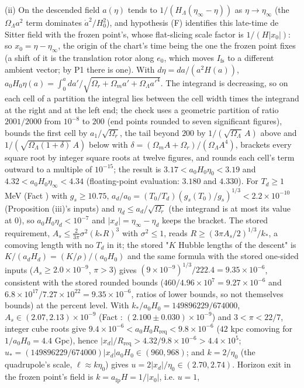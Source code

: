 (ii) On the descended field $a(\eta)$ tends to $1/(H_{\Lambda}(\eta_{\infty} - \eta))$ as $\eta \to \eta_{\infty}$ (the $\Omega_{\Lambda}a^{2}$ term dominates $\dot a^{2}/H_{0}^{2}$), and hypothesis (F) identifies this late-time de Sitter field with the frozen point's, whose flat-slicing scale factor is $1/(H|x_{0}|)$: so $x_{0} = \eta - \eta_{\infty}$, the origin of the chart's time being the one the frozen point fixes (a shift of it is the translation rotor along $e_{0}$, which moves $I_{\mathrm{fs}}$ to a different ambient vector; by P1 there is one). With $d\eta = da/(a^{2}H(a))$, $a_{0}H_{0}\eta(a) = \int_{0}^{a}da'/\sqrt{\Omega_{r} + \Omega_{m}a' + \Omega_{\Lambda}a'^{4}}$. The integrand is decreasing, so on each cell of a partition the integral lies between the cell width times the integrand at the right and at the left end; the check uses a geometric partition of ratio $2001/2000$ from $10^{-8}$ to $200$ (end points rounded to seven significant figures), bounds the first cell by $a_{1}/\sqrt{\Omega_{r}}$, the tail beyond $200$ by $1/(\sqrt{\Omega_{\Lambda}}\,A)$ above and $1/(\sqrt{\Omega_{\Lambda}(1 + \delta)}\,A)$ below with $\delta = (\Omega_{m}A + \Omega_{r})/(\Omega_{\Lambda}A^{4})$, brackets every square root by integer square roots at twelve figures, and rounds each cell's term outward to a multiple of $10^{-15}$; the result is $3.17 < a_{0}H_{0}\eta_{0} < 3.19$ and $4.32 < a_{0}H_{0}\eta_{\infty} < 4.34$ (floating-point evaluation: $3.180$ and $4.330$). For $T_{d} \ge 1$ MeV (Fact ) with $g_{s} \ge 10.75$, $a_{d}/a_{0} = (T_{0}/T_{d})(g_{s}(T_{0})/g_{s})^{1/3} < 2.2 \times 10^{-10}$ (Proposition (iii)'s inputs) and $\eta_{d} \le a_{d}/\sqrt{\Omega_{r}}$ (the integrand is at most its value at $0$), so $a_{0}H_{0}\eta_{d} < 10^{-7}$ and $|x_{d}| = \eta_{\infty} - \eta_{d}$ keeps the bracket. The stored requirement, $A_{s} \le \tfrac{2}{3\pi}\sigma^{2}(k_{*}R)^{3}$ with $\sigma^{2} \le 1$, reads $R \ge (3\pi A_{s}/2)^{1/3}/k_{*}$, a comoving length with no $T_{d}$ in it; the stored "$K$ Hubble lengths of the descent" is $K/(a_{d}H_{d}) = (K/\rho)/(a_{0}H_{0})$ and the same formula with the stored one-sided inputs ($A_{s} \ge 2.0 \times 10^{-9}$, $\pi > 3$) gives $(9 \times 10^{-9})^{1/3}/222.4 = 9.35 \times 10^{-6}$, consistent with the stored rounded bounds ($460/4.96 \times 10^{7} = 9.27 \times 10^{-6}$ and $6.8 \times 10^{17}/7.27 \times 10^{22} = 9.35 \times 10^{-6}$, ratios of lower bounds, so not themselves bounds) at the percent level. With $k_{*}/a_{0}H_{0} = 149896229/674000$, $A_{s} \in (2.07, 2.13) \times 10^{-9}$ (Fact : $(2.100 \pm 0.030) \times 10^{-9}$) and $3 < \pi < 22/7$, integer cube roots give $9.4 \times 10^{-6} < a_{0}H_{0}R_{\mathrm{req}} < 9.8 \times 10^{-6}$ ($42$ kpc comoving for $1/a_{0}H_{0} = 4.4$ Gpc), hence $|x_{d}|/R_{\mathrm{req}} > 4.32/9.8 \times 10^{-6} > 4.4 \times 10^{5}$; $u_{*} = (149896229/674000)|x_{d}|a_{0}H_{0} \in (960, 968)$; and $k = 2/\eta_{0}$ (the quadrupole's scale, $\ell \approx k\eta_{0}$) gives $u = 2|x_{d}|/\eta_{0} \in (2.70, 2.74)$. Horizon exit in the frozen point's field is $k = a_{\mathrm{fp}}H = 1/|x_{0}|$, i.e. $u = 1$, 